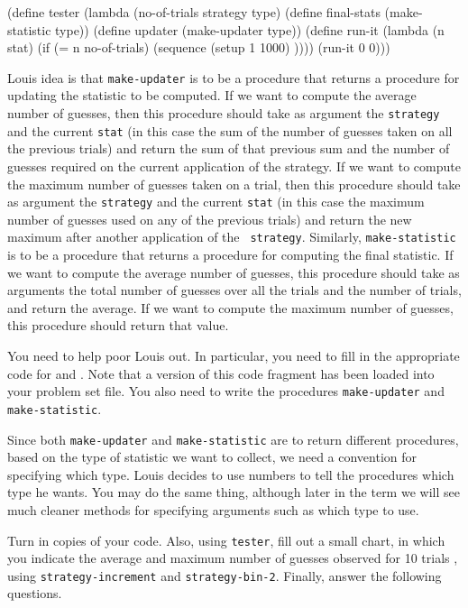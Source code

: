 \beginlisp
(define tester
  (lambda (no-of-trials strategy type)
    (define final-stats (make-statistic type))
    (define updater (make-updater type))
    (define run-it
      (lambda (n stat)
        (if (= n no-of-trials)
            (sequence (setup 1 1000)
                      ))))
    (run-it 0 0)))
\endlisp


Louis idea is that {\tt make-updater} is to be a procedure that returns
a procedure for updating the statistic to be computed.  If we want to
compute the average number of guesses, then this procedure should take
as argument the {\tt strategy} and the current {\tt stat} (in this case
the sum of the number of guesses taken on all the previous trials) and
return the sum of that previous sum and the number of guesses required
on the current application of the strategy.  If we want to compute the
maximum number of guesses taken on a trial, then this procedure should
take as argument the {\tt strategy} and the current {\tt stat} (in this
case the maximum number of guesses used on any of the previous trials)
and return the new maximum after another application of the {\tt
strategy}.  Similarly, {\tt make-statistic} is to be a procedure that
returns a procedure for computing the final statistic.  If we want to
compute the average number of guesses, this procedure should take as
arguments the total number of guesses over all the trials and the number
of trials, and return the average.  If we want to compute the maximum
number of guesses, this procedure should return that value.

You need to help poor Louis out.   In particular, you need to fill in
the appropriate code for  and .  Note that
a version of this code fragment has been loaded into your problem set
file. You also need to write the procedures {\tt make-updater} and {\tt
make-statistic}.

Since both {\tt make-updater} and {\tt make-statistic} are to return
different procedures, based on the type of statistic we want to collect,
we need a convention for specifying which type.  Louis decides to use
numbers to tell the procedures which type he wants.  You may do the same
thing, although later in the term we will see much cleaner methods for
specifying arguments such as which type to use.

Turn in copies of your code.  Also, using {\tt tester}, fill out a
small chart, in which
you indicate the average and maximum number of guesses observed for 10
trials , using {\tt strategy-increment} and {\tt strategy-bin-2}.
Finally, 
answer the following questions. 

